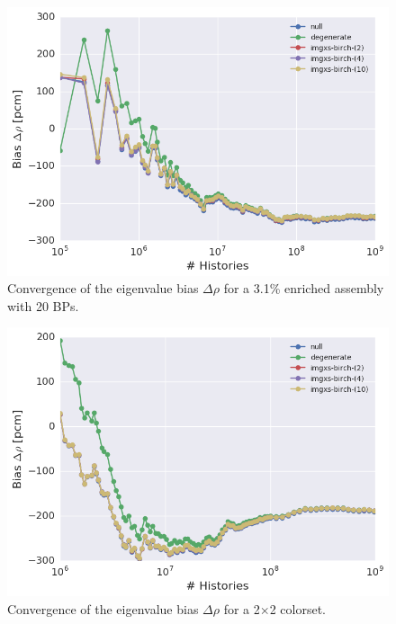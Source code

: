 \begin{figure}[h!]
\centering
\includegraphics[width=0.87\linewidth]{figures/results/convergence/assm-31-20BPs/keff-bias-evo}
\vspace{2mm}
\caption[Eigenvalue bias covergence for a 3.1\% enriched assembly with 20 \acp{BP}]{Convergence of the eigenvalue bias $\Delta\rho$ for a 3.1\% enriched assembly with 20 \acp{BP}.}
\label{fig:chap11-assm-3.1-20BPs-eigenvalue-converge}
\end{figure}

\begin{figure}[h!]
\centering
\includegraphics[width=0.87\linewidth]{figures/results/convergence/2x2/keff-bias-evo}
\vspace{2mm}
\caption[Eigenvalue bias covergence for a 2$\times$2 colorset]{Convergence of the eigenvalue bias $\Delta\rho$ for a 2$\times$2 colorset.}
\label{fig:chap11-2x2-eigenvalue-converge}
\end{figure}

